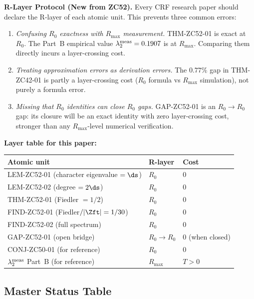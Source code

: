 \documentclass[12pt, a4paper]{article}
\begin{document}
\begin{layerbox}
\textbf{R-Layer Protocol (New from ZC52).}
Every CRF research paper should declare the R-layer of each
atomic unit. This prevents three common errors:

\begin{enumerate}[leftmargin=2em]
\item \emph{Confusing $R_0$ exactness with $R_{\max}$ measurement.}
  THM-ZC52-01 is exact at $R_0$. The Part~B empirical value
  $\lambda_2^{\rm meas}=0.1907$ is at $R_{\max}$. Comparing
  them directly incurs a layer-crossing cost.

\item \emph{Treating approximation errors as derivation errors.}
  The $0.77\%$ gap in THM-ZC42-01 is partly a layer-crossing
  cost ($R_0$ formula vs $R_{\max}$ simulation), not purely
  a formula error.

\item \emph{Missing that $R_0$ identities can close $R_0$ gaps.}
  GAP-ZC52-01 is an $R_0\to R_0$ gap: its closure will be
  an exact identity with zero layer-crossing cost, stronger
  than any $R_{\max}$-level numerical verification.
\end{enumerate}

\textbf{Layer table for this paper:}
\begin{center}
\begin{tabular}{@{}lll@{}}
\toprule
Atomic unit & R-layer & Cost \\
\midrule
LEM-ZC52-01 (character eigenvalue $=\ds$) & $R_0$ & $0$ \\
LEM-ZC52-02 (degree $=2\ds$) & $R_0$ & $0$ \\
THM-ZC52-01 (Fiedler $=1/2$) & $R_0$ & $0$ \\
FIND-ZC52-01 (Fiedler$/|\Zft|=1/30$) & $R_0$ & $0$ \\
FIND-ZC52-02 (full spectrum) & $R_0$ & $0$ \\
GAP-ZC52-01 (open bridge) & $R_0\to R_0$ & $0$ (when closed) \\
\midrule
CONJ-ZC50-01 (for reference) & $R_0$ & $0$ \\
$\lambda_2^{\rm meas}$ Part~B (for reference) & $R_{\max}$ & $T>0$ \\
\bottomrule
\end{tabular}
\end{center}
\end{layerbox}

\subsection{Master Status Table}
\end{document}
